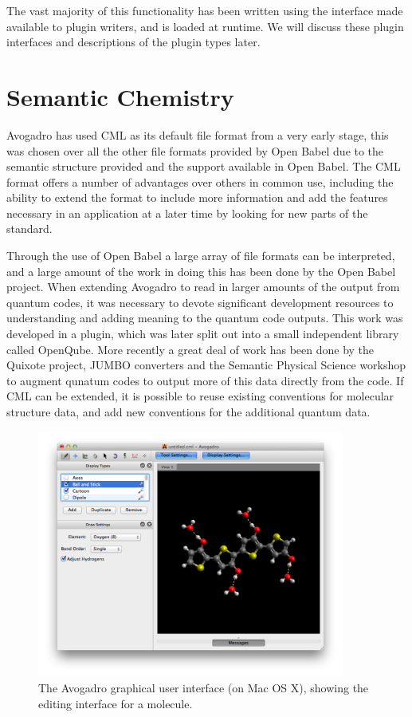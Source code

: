 \documentclass[10pt]{bmc_article}
\newenvironment{bmcformat}{\begin{raggedright}
\baselineskip20pt\sloppy\setboolean{publ}{false}}{\end{raggedright}
\baselineskip20pt\sloppy}
\begin{document}
\begin{bmcformat}
The vast majority of this functionality has been written using the
interface made available to plugin writers, and is loaded at
runtime. We will discuss these plugin interfaces and descriptions of
the plugin types later.

\section{Semantic Chemistry}

Avogadro has used CML as its default file format from a very early stage, this
was chosen over all the other file formats provided by Open Babel due to the
semantic structure provided and the support available in Open Babel. The CML
format offers a number of advantages over others in common use, including the
ability to extend the format to include more information and add the features
necessary in an application at a later time by looking for new parts of the
standard.

Through the use of Open Babel a large array of file formats can be interpreted,
and a large amount of the work in doing this has been done by the Open Babel
project. When extending Avogadro to read in larger amounts of the output from
quantum codes, it was necessary to devote significant development resources to
understanding and adding meaning to the quantum code outputs. This work was
developed in a plugin, which was later split out into a small independent
library called OpenQube. More recently a great deal of work has been done
by the Quixote project, JUMBO converters and the Semantic Physical Science
workshop to augment qunatum codes to output more of this data directly from
the code. If CML can be extended, it is possible to reuse existing conventions
for molecular structure data, and add new conventions for the additional
quantum data.

\begin{figure}
  \begin{center}
    \includegraphics[width=0.9\textwidth]{images/avogadro-drawing}
  \end{center}
  \caption{The Avogadro graphical user interface (on Mac OS X), showing the
editing interface
for a molecule.}
  \label{f:avogadrogui}
\end{figure}



\end{bmcformat}
\end{document}
